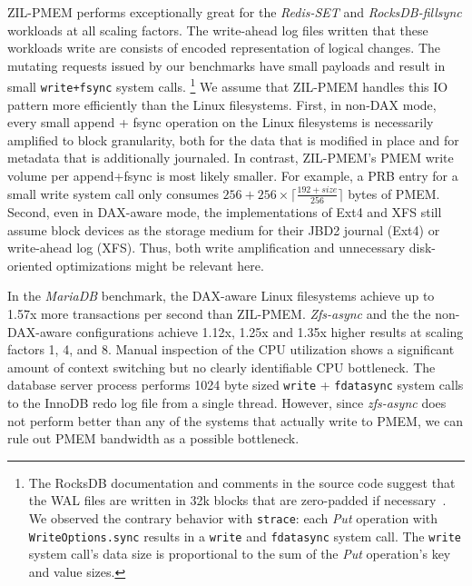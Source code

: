 \documentclass[12pt,a4paper,twoside]{book}
\begin{document}
ZIL-PMEM performs exceptionally great for the \textit{Redis-SET} and \textit{RocksDB-fillsync} workloads at all scaling factors.
The write-ahead log files written that these workloads write are consists of encoded representation of logical changes.
The mutating requests issued by our benchmarks have small payloads and result in small \lstinline{write+fsync} system calls.%
\footnote{
    The RocksDB documentation and comments in the source code suggest that the WAL files are written in 32k blocks that are zero-padded if necessary~\cite[db/log\_writer.h]{RocksDBGitHubWikiWalPerformance}.
    We observed the contrary behavior with \lstinline{strace}: each \textit{Put} operation with \lstinline{WriteOptions.sync} results in a \lstinline{write} and \lstinline{fdatasync} system call. The \lstinline{write} system call's data size is proportional to the sum of the \textit{Put} operation's key and value sizes.
}
We assume that ZIL-PMEM handles this IO pattern more efficiently than the Linux filesystems.
First, in non-DAX mode, every small append + fsync operation on the Linux filesystems is necessarily amplified to block granularity, both for the data that is modified in place and for metadata that is additionally journaled.
In contrast, ZIL-PMEM's PMEM write volume per append+fsync is most likely smaller.
For example, a PRB entry for a small write system call only consumes $256 + 256 \times \lceil \frac{192 + size}{256} \rceil$ bytes of PMEM.
Second, even in DAX-aware mode, the implementations of Ext4 and XFS still assume block devices as the storage medium for their JBD2 journal (Ext4) or write-ahead log (XFS).
Thus, both write amplification and unnecessary disk-oriented optimizations might be relevant here.

In the \textit{MariaDB} benchmark, the DAX-aware Linux filesystems achieve up to 1.57x more transactions per second than ZIL-PMEM.
\textit{Zfs-async} and the the non-DAX-aware configurations achieve 1.12x, 1.25x and 1.35x higher results at scaling factors 1, 4, and 8.
Manual inspection of the CPU utilization shows a significant amount of context switching but no clearly identifiable CPU bottleneck.
The database server process performs 1024 byte sized \lstinline{write} + \lstinline{fdatasync} system calls to the InnoDB redo log file from a single thread.
However, since \textit{zfs-async} does not perform better than any of the systems that actually write to PMEM, we can rule out PMEM bandwidth as a possible bottleneck.
\end{document}
